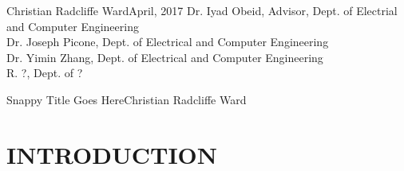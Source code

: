 \documentclass[reqno,12pt,oneside]{report} %
\theoremstyle{plain}
\theoremstyle{definition}
\theoremstyle{remark}
\numberwithin{theorem}{chapter}
\begin{document}
{Christian Radcliffe Ward}{April, 2017}
{Dr. Iyad Obeid, Advisor, Dept. of Electrial and Computer Engineering \\
 Dr. Joseph Picone, Dept. of Electrical and Computer Engineering \\
 Dr. Yimin Zhang, Dept. of Electrical and Computer Engineering \\
 R. ?, Dept. of ? \\
}
\initializefrontsections



\startabstractpage
{Snappy Title Goes Here}{Christian Radcliffe Ward}

\label{Abstract}

\startacknowledgementspage

\label{Acknowledgements}


%

\tableofcontents     %
\listoffigures       %
\listoftables        %

\startthechapters
\chapter{INTRODUCTION}
 \label{chap:Particles}
 
\end{document}
